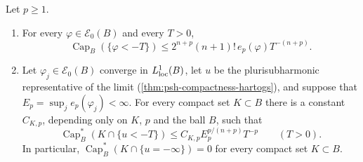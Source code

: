 \begin{proposition}\label{prop:energy-controlled-local-capacity-tails}
Let $p\geq1$.
\begin{enumerate}
\item For every $\varphi\in\mathcal E_0(B)$ and every $T>0$,
\[
 \operatorname{Cap}_B(\{\varphi<-T\})
             \leq2^{n+p}(n+1)!\,e_p(\varphi)T^{-(n+p)}.
\]
\item Let $\varphi_j\in\mathcal E_0(B)$ converge in $L^1_{\mathrm{loc}}(B)$, let $u$ be the plurisubharmonic representative of the limit (\cref{thm:psh-compactness-hartogs}), and suppose that $E_p=\sup_je_p(\varphi_j)<\infty$. For every compact set $K\subset B$ there is a constant $C_{K,p}$, depending only on $K$, $p$ and the ball $B$, such that
\begin{equation}\label{eq:energy-limit-capacity-tail}
 \operatorname{Cap}_B^*(K\cap\{u<-T\})
                \leq C_{K,p}E_p^{p/(n+p)}T^{-p}\qquad(T>0).
\end{equation}
In particular, $\operatorname{Cap}^*_B(K\cap\{u=-\infty\})=0$ for every compact set $K\subset B$.
\end{enumerate}
\end{proposition}
